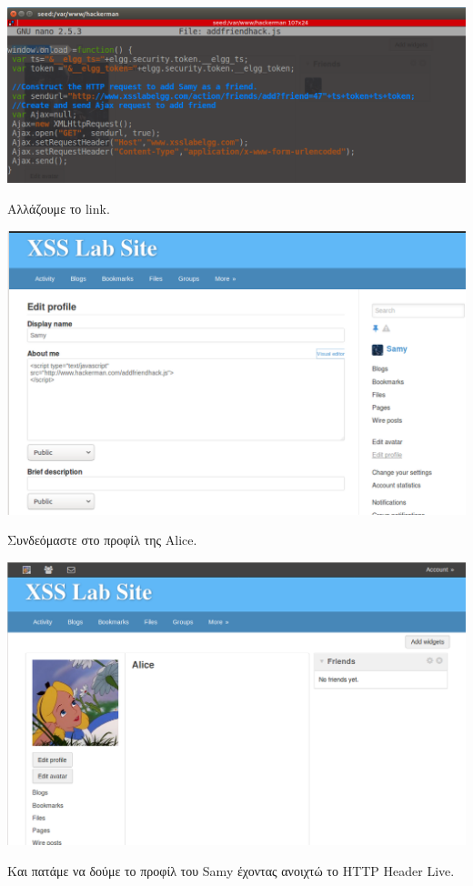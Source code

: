 \begin{center}
			\includegraphics[width=1\textwidth]{image/4.3.PNG}		
\end{center}
\noindent 
Αλλάζουμε το link.
\begin{center}
			\includegraphics[width=1\textwidth]{image/4.2.PNG}		
\end{center}
\noindent
Συνδεόμαστε στο προφίλ της Alice. 
\begin{center}
			\includegraphics[width=1\textwidth]{image/4.4.PNG}		
\end{center}
\noindent
Και πατάμε να δούμε το προφίλ του Samy έχοντας ανοιχτώ το HTTP Header Live.

